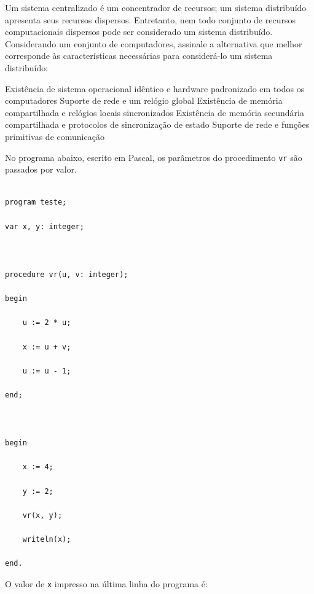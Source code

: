 \documentclass[12pt, addpoints]{exam}
\begin{document}
\begin{questions}
\question

Um sistema centralizado é um concentrador de recursos; um sistema distribuído apresenta seus recursos dispersos. Entretanto, nem todo conjunto de recursos computacionais dispersos pode ser considerado um sistema distribuído. Considerando um conjunto de computadores, assinale a alternativa que melhor corresponde às características necessárias para considerá-lo um sistema distribuído:
\begin{choices}
\choice Existência de sistema operacional idêntico e hardware padronizado em todos os computadores
\choice Suporte de rede e um relógio global
\choice Existência de memória compartilhada e relógios locais sincronizados 
\choice Existência de memória secundária compartilhada e protocolos de sincronização de estado
\choice Suporte de rede e funções primitivas de comunicação 
\end{choices}

\question

No programa abaixo, escrito em Pascal, os parâmetros do procedimento \texttt{vr} são passados por valor.



\begin{verbatim}

program teste;

var x, y: integer;



procedure vr(u, v: integer);

begin

    u := 2 * u;

    x := u + v;

    u := u - 1;

end;



begin

    x := 4;

    y := 2;

    vr(x, y);

    writeln(x);

end.

\end{verbatim}



O valor de \texttt{x} impresso na última linha do programa é:
\begin{choices}
\end{choices}

\question


\end{questions}
\end{document}
